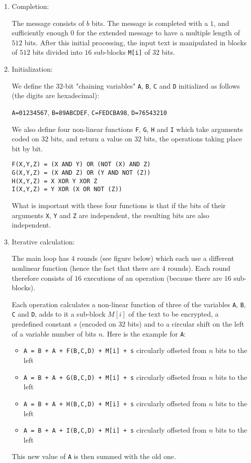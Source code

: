 	\begin{enumerate}
		\item Completion:
		
		The message consists of $b$ bits. The message is completed with a $1$, and sufficiently enough $0$ for the extended message to have a multiple length of $512$ bits. After this initial processing, the input text is manipulated in blocks of $512$ bits divided into $16$ sub-blocks \texttt{M[i]} of $32$ bits.
		
		\item Initialization:
		
		We define the $32$-bit "chaining variables" \texttt{A}, \texttt{B}, \texttt{C} and \texttt{D} initialized as follows (the digits are hexadecimal):
		\begin{center}
			\texttt{A=01234567}, \texttt{B=89ABCDEF}, \texttt{C=FEDCBA98}, \texttt{D=76543210}
		\end{center}
		We also define four non-linear functions \texttt{F}, \texttt{G}, \texttt{H} and \texttt{I} which take arguments coded on $32$ bits, and return a value on $32$ bits, the operations taking place bit by bit.
	
		\texttt{F(X,Y,Z) = (X AND Y) OR (NOT (X) AND Z)}\\
		\texttt{G(X,Y,Z) = (X AND Z) OR (Y AND NOT (Z))}\\
		\texttt{H(X,Y,Z) = X XOR Y XOR Z}\\
		\texttt{I(X,Y,Z) = Y XOR (X OR NOT (Z))}
	
		What is important with these four functions is that if the bits of their arguments \texttt{X}, \texttt{Y} and \texttt{Z} are independent, the resulting bits are also independent.
		
		\item Iterative calculation:
		
		The main loop has $4$ rounds (see figure below) which each use a different nonlinear function (hence the fact that there are $4$ rounds). Each round therefore consists of $16$ executions of an operation (because there are $16$ sub-blocks).

		Each operation calculates a non-linear function of three of the variables \texttt{A}, \texttt{B}, \texttt{C} and \texttt{D}, adds to it a sub-block $M[i]$ of the text to be encrypted, a predefined constant $s$ (encoded on $32$ bits) and to a circular shift on the left of a variable number of bits $n$. Here is the example for \texttt{A}:
		\begin{itemize}
			\item \texttt{A = B + A + F(B,C,D) + M[i] + s} circularly offseted from $n$ bits to the left
			\item \texttt{A = B + A + G(B,C,D) + M[i] + s} circularly offseted from $n$ bits to the left
			\item \texttt{A = B + A + H(B,C,D) + M[i] + s} circularly offseted from $n$ bits to the left
			\item \texttt{A = B + A + I(B,C,D) + M[i] + s} circularly offseted from $n$ bits to the left
		\end{itemize}
		This new value of \texttt{A} is then summed with the old one.
		

\end{enumerate}
